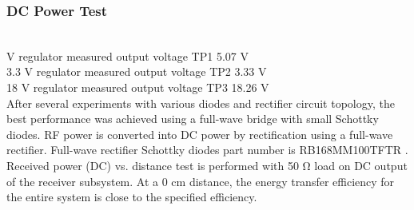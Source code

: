 \documentclass[12pt]{article}
\begin{document}
\subsubsection*{DC Power Test} \hfill \\
 V regulator measured output voltage TP1 5.07 V\\
3.3 V regulator measured output voltage TP2 3.33 V\\
18 V regulator measured output voltage TP3 18.26 V\\

\indent
After several experiments with various diodes and rectifier circuit topology, the best performance was achieved using a full-wave bridge with small Schottky diodes. RF power is converted into DC power by rectification using a full-wave rectifier. Full-wave rectifier Schottky diodes part number is  RB168MM100TFTR . Received power (DC) vs. distance test is performed with 50 Ω load on DC output of the receiver subsystem. At a 0 cm distance, the energy transfer efficiency for the entire system is close to the specified efficiency.
\end{document}
